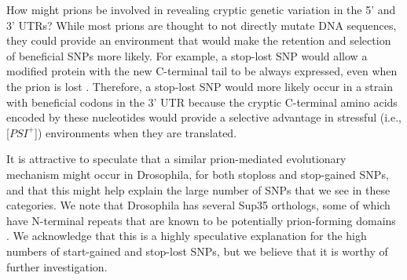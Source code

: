 How might prions be involved in revealing cryptic genetic variation in the 5' and 3' UTRs? While most prions are thought to not directly mutate DNA sequences, they could provide an environment that would make the retention and selection of beneficial SNPs more likely. For example, a stop-lost SNP would allow a modified protein with the new C-terminal tail to be always expressed, even when the prion is lost \cite{tyedmers2008prion}. Therefore, a stop-lost SNP would more likely occur in a strain with beneficial codons in the 3' UTR because the cryptic C-terminal amino acids encoded by these nucleotides would provide a selective advantage in stressful (i.e., [$PSI^+$]) environments when they are translated.


It is attractive to speculate that a similar prion-mediated evolutionary mechanism might occur in Drosophila, for both stoploss and stop-gained SNPs, and that this might help explain the large number of SNPs that we see in these categories. We note that Drosophila has several Sup35 orthologs, some of which have N-terminal repeats that are known to be potentially prion-forming domains \cite{tyedmers2008prion}. We acknowledge that this is a highly speculative explanation for the high numbers of start-gained and stop-lost SNPs, but we believe that it is worthy of further investigation.

